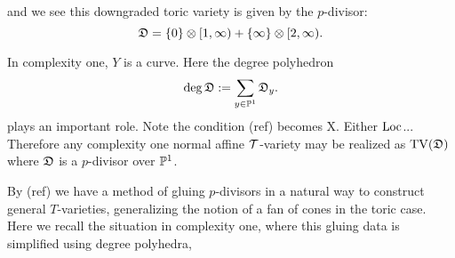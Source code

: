 \begin{example}
\begin{figure}[H]
\label{fig:data230b}
\end{figure}
and we see this downgraded toric variety is given by the \(p\)-divisor:
\[
{\mathfrak{D}} = \{0\} \otimes [1, \infty) + \{\infty\} \otimes [2,\infty).
\]
\end{example}
In complexity one, \(Y\) is a curve. Here the degree polyhedron
\[
\deg {\mathfrak{D}} := \sum_{y \in \mathbb{P}^1} {\mathfrak{D}}_y.
\]
plays an important role. Note the condition (ref) becomes X. Either \(\operatorname{Loc} \)... Therefore any complexity one normal affine \({\mathcal{T}}\)-variety may be realized as \(\operatorname{TV}({\mathfrak{D}})\) where \({\mathfrak{D}}\) is a \(p\)-divisor over \(\mathbb{P}^1\).

By (ref) we have a method of gluing \(p\)-divisors in a natural way to construct general \(T\)-varieties, generalizing the notion of a fan of cones in the toric case. Here we recall the situation in complexity one, where this gluing data is simplified using degree polyhedra, 

